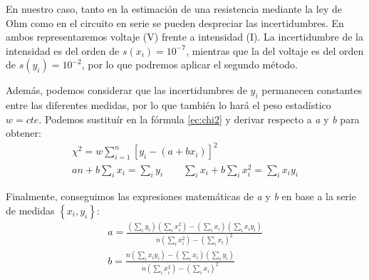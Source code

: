 \documentclass[12pt, a4paper, titlepage]{article}
\begin{document}
  En nuestro caso, tanto en la estimación de una resistencia mediante la ley de Ohm como en el circuito en serie se pueden despreciar las incertidumbres. En ambos representaremos voltaje (V) frente a intensidad (I). La incertidumbre de la intensidad es del orden de $s(x_i)=10^{-7}$, mientras que la del voltaje es del orden de $s(y_i)=10^{-2}$, por lo que podremos aplicar el segundo método.

  Además, podemos considerar que las incertidumbres de $y_i$ permanecen constantes entre las diferentes medidas, por lo que también lo hará el peso estadístico $w = cte$. Podemos sustituír en la fórmula \ref{ec:chi2} y derivar respecto a \textit{a} y \textit{b} para obtener:
  \begin{gather}
    \chi^2 = w\sum^{n}_{i=1}[y_i - (a + bx_i)]^2 \nonumber \\
    a n + b\sum_{i}x_i = \sum_{i}y_i \quad \quad \sum_{i}x_i + b\sum_{i}x_i^2 = \sum_{i}x_i y_i \label{ec:dchi}
  \end{gather}

  Finalmente, conseguimos las expresiones matemáticas de \textit{a} y \textit{b} en base a la serie de medidas $\left\{ x_i, y_i \right\}$:
  \begin{gather}
    a = \frac{\left ( \sum_i y_i \right )\left ( \sum_i x_i^2 \right ) - \left ( \sum_i x_i \right )\left ( \sum_i x_i y_i \right )}{n\left ( \sum_i x_i^2 \right ) - \left ( \sum_i x_i \right )^2} \label{ec:a} \\
    b = \frac{n\left ( \sum_i x_i y_i \right ) - \left ( \sum_i x_i \right )\left ( \sum_i y_i \right )}{n\left ( \sum_i x_i^2 \right )-\left ( \sum_i x_i \right )^2} \label{ec:b}
  \end{gather}
\end{document}
